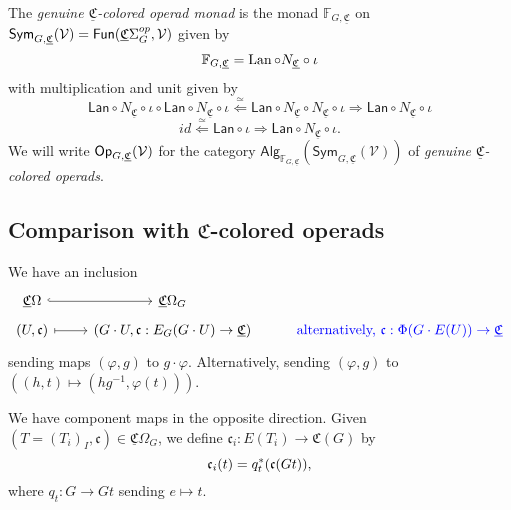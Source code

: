 \documentclass[a4paper,10pt
]{article}%
\renewcommand{\phi}{\varphi}
\newcommand{\UC}{\underline{\mathfrak C}}
\renewcommand{\1}{\ensuremath{\mathbb{id}}}
\begin{document}
\begin{definition}
      The \textit{genuine $\UC$-colored operad monad} is the monad
      $\mathbb F_{G,\UC}$ on $\Sym_{G, \UC}(\V) = \mathsf{Fun}(\UC\Sigma_G^{op}, \V)$ given by
      \begin{equation}
            \mathbb F_{G,\UC} = \Lan \circ N_{\UC} \circ \iota
      \end{equation}
      with multiplication and unit given by
      \begin{equation}
            \mathsf{Lan} \circ N_{\UC} \circ \iota \circ
            \mathsf{Lan} \circ N_{\UC} \circ \iota
            \overset{\simeq}{\Leftarrow}
            \mathsf{Lan} \circ N_{\UC} \circ  N_{\UC} \circ \iota
            \Rightarrow
            \mathsf{Lan} \circ N_{\UC} \circ \iota
      \end{equation}
      \begin{equation}
            id \overset{\simeq}{\Leftarrow} \mathsf{Lan} \circ \iota
            \Rightarrow
            \mathsf{Lan} \circ N_{\UC} \circ \iota.
      \end{equation}
      We will write $\Op_{G,\UC}(\V)$ for the category 
      $\mathsf{Alg}_{\mathbb{F}_{G,\UC}}(\mathsf{Sym}_{G,\UC}(\mathcal{V}))$ of \textit{genuine $\UC$-colored operads}.
\end{definition}



\subsection{Comparison with $\mathfrak C$-colored operads}

We have an inclusion
\begin{equation}
      \begin{tikzcd}[row sep = tiny]
            \UC\Omega \arrow[r, hookrightarrow]
            &
            \UC\Omega_G
            \\
            (U, \mathfrak c) \arrow[r, mapsto]
            &
            (G \cdot U, \mathfrak c: E_G(G \cdot U) \to \UC)
            &
            \mbox{\color{blue} alternatively, $\mathfrak c: \Phi(G \cdot E(U)) \to \UC$}
      \end{tikzcd}
\end{equation}
sending maps $(\phi, g)$ to $g \cdot \phi$.
{\color{blue} Alternatively, sending $(\phi,g)$ to $((h,t) \mapsto (hg^{-1}, \phi(t)))$.}

We have component maps in the opposite direction.
Given $(T = (T_i)_I, \mathfrak c) \in \UC\Omega_G$, we define
$\mathfrak c_i: E(T_i) \to \mathfrak C(G)$ by
\begin{equation}
      \mathfrak c_i(t) = q_t^{\**}(\mathfrak c (G t)),
\end{equation}
where
$q_t: G \to Gt$ sending $e \mapsto t$. 
\end{document}
